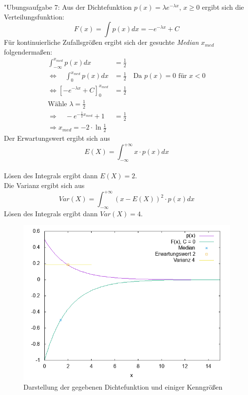 \documentclass[fleqn,a4paper,12pt]{article}
\begin{document}
  "Ubungsaufgabe 7: \newline
  Aus der Dichtefunktion $p(x) = \lambda e^{-\lambda x}$, $x \geq 0$ ergibt sich die Verteilungsfunktion: \[F(x) = \int p(x) dx = -e^{-\lambda x} + C\]
  Für kontinuierliche Zufallsgrößen ergibt sich der gesuchte \textit{Median} $x_{med}$ folgendermaßen:
  \begin{align*}
      \int_{-\infty}^{x_{med}} p(x) dx &= \frac{1}{2} \\
      \Leftrightarrow \quad \int_0^{x_{med}} p(x) dx &= \frac{1}{2} \quad \text{Da }  p(x) = 0 \text{ für } x < 0 \\
      \Leftrightarrow \left[ -e^{-\lambda x} + C \right]_{0}^{x_{med}} &= \frac{1}{2} \\
      \text{Wähle } \lambda = \frac{1}{2} \\
      \Rightarrow \quad -e^{-\frac{1}{2}x_{med}} + 1 &= \frac{1}{2} \\
      \Rightarrow x_{med} = -2 \cdot \ln \frac{1}{2}
  \end{align*}
  Der Erwartungswert ergibt sich aus \[E(X) = \int_{-\infty}^{+\infty} x \cdot  p(x) dx\] \\
  Lösen des Integrals ergibt dann $E(X) = 2$. \\
  Die Varianz ergibt sich aus \[\textit{Var}(X) = \int_{-\infty}^{+\infty} ( x - E(X) )^2 \cdot p(x) dx\]
  Lösen des Integrals ergibt dann $\textit{Var}(X) = 4$.
  \begin{figure}
      \includegraphics[width=1.0\textwidth]{sv0_7.png}
      \caption{Darstellung der gegebenen Dichtefunktion und einiger Kenngrößen}
  \end{figure}
  
\end{document}
